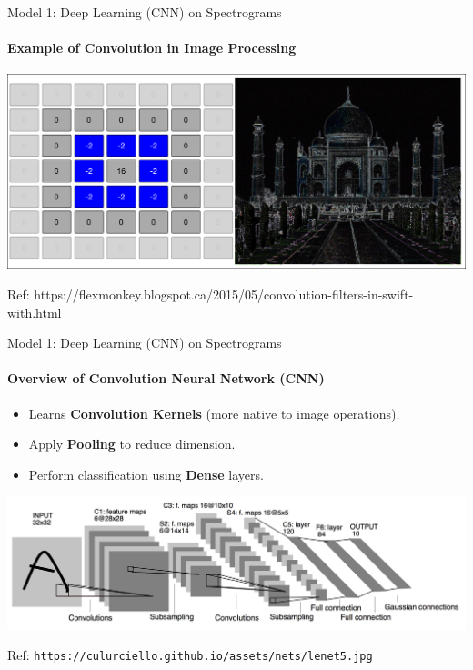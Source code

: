 \documentclass{beamer}
\begin{document}
\begin{frame}{Model 1: Deep Learning (CNN) on Spectrograms}
  \framesubtitle{Example of Convolution in Image Processing}

  \begin{center}
  \includegraphics[scale=0.26]{img/mahal_conv.png}

  Ref: https://flexmonkey.blogspot.ca/2015/05/convolution-filters-in-swift-with.html
  \end{center}
\end{frame}



\begin{frame}{Model 1: Deep Learning (CNN) on Spectrograms}
  \framesubtitle{Overview of Convolution Neural Network (CNN)}

  \begin{block}{}
    \begin{itemize}
    \item Learns \textbf{Convolution Kernels} (more native to image operations).
    \item Apply \textbf{Pooling} to reduce dimension.
    \item Perform classification using \textbf{Dense} layers.
    \end{itemize}
  \end{block}
  
  \begin{center}
    \includegraphics[scale=0.15]{img/cnn_gen.jpg}

    Ref: \texttt{https://culurciello.github.io/assets/nets/lenet5.jpg}
  \end{center}

\end{frame}
\end{document}
